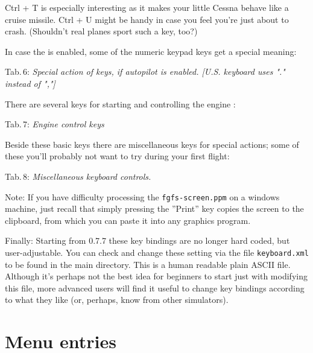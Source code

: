 \centerline{}
\medskip

\noindent Ctrl + T is especially interesting as it makes your little Cessna behave
like a cruise missile. Ctrl + U might be handy in case you feel you're just about to
crash. (Shouldn't real planes sport such a key, too?)

In case the  is enabled, some of the numeric keypad keys get a special
meaning:

\noindent
 Tab.\,6: \textit{Special action of keys, if autopilot is
 enabled. [U.S. keyboard uses "." instead of ","]}
\medskip

\centerline{}
\medskip

There are several keys for starting and controlling the engine :

\noindent
 Tab.\,7: \textit{Engine control keys}
\medskip

\centerline{}
\medskip

Beside these basic keys there are miscellaneous keys for special actions; some of these you'll probably not want to try during your first flight:
\vfill
\eject

\noindent Tab.\,8: \textit{Miscellaneous keyboard controls.}
\medskip

\centerline{}
\medskip

\noindent
 Note: If you have difficulty processing the  \texttt{fgfs-screen.ppm}
on a windows machine, just recall that simply pressing the ''Print'' key copies the
screen to the clipboard, from which you can paste it into any graphics program.

Finally: Starting from \FlightGear{} 0.7.7  these key bindings are no longer hard coded, but user-adjustable. You can check and change these setting via the file \texttt{keyboard.xml} to
be found in the main \FlightGear{} directory. This is a human readable plain ASCII file.
Although it's perhaps not the best idea for beginners to start just with modifying this
file, more advanced users will find it useful to change key bindings according to what
they like (or, perhaps, know from other simulators).

\section{Menu entries}

